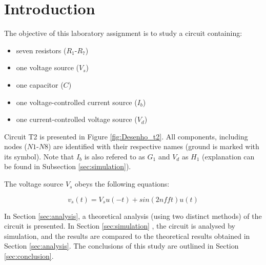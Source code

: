 
\section{Introduction}
\label{sec:introduction}


The objective of this laboratory assignment is to study a circuit containing:
\begin{itemize}
	\item seven resistors ($R_1$-$R_7$)
	\item one voltage source ($V_s$) %
	\item one capacitor ($C$)
	\item one voltage-controlled current source ($I_b$)
	\item one current-controlled voltage source ($V_d$)
\end{itemize}


Circuit T2 is presented in Figure \ref{fig:Desenho_t2}. All components, including nodes
($N1$-$N8$) are identified with their respective names (ground is marked with its symbol).
Note that $I_b$ is also refered to as $G_1$ and $V_d$ as $H_1$ (explanation can be found
in Subsection \ref{sec:simulation}).

The voltage source $V_s$ obeys the following equations:

\begin{equation}
	v_s(t) = V_su(-t) + sin(2nfft)u(t)
\end{equation}





In Section \ref{sec:analysis}, a theoretical analysis (using two distinct methods) of
the circuit is presented. In Section \ref{sec:simulation} , the circuit is analysed by
simulation, and the results are compared to the theoretical results obtained in Section
\ref{sec:analysis}. The conclusions of this study are outlined in Section \ref{sec:conclusion}.


